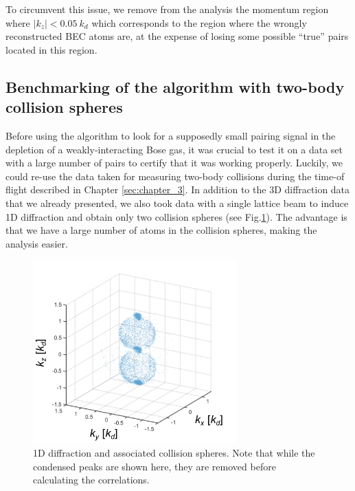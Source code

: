 To circumvent this issue, we remove from the analysis the momentum region where $|k_z| < 0.05 \ k_d$ which corresponds to the region where the wrongly reconstructed BEC atoms are, at the expense of losing some possible ``true'' pairs located in this region.



\subsection{Benchmarking of the algorithm with two-body collision spheres}

\label{sec:benchmark_algo}

Before using the algorithm to look for a supposedly small \kmk pairing signal in the depletion of a weakly-interacting Bose gas, it was crucial to test it on a data set with a large number of \kmk pairs to certify that it was working properly. Luckily, we could re-use the data taken for measuring two-body collisions during the time-of flight described in Chapter \ref{sec:chapter_3}. In addition to the 3D diffraction data that we already presented, we also took data with a single lattice beam to induce 1D diffraction and obtain only two collision spheres (see Fig.\ref{fig:1D_spheres}). The advantage is that we have a large number of atoms in the collision spheres, making the analysis easier. 

\begin{figure}
    \centering
    \includegraphics[width=0.7\textwidth]{Fig/Chapter4/1d_spheres.png}
    \caption{1D diffraction and associated collision spheres. Note that while the condensed peaks are shown here, they are removed before calculating the correlations.}
    \label{fig:1D_spheres}
\end{figure}

